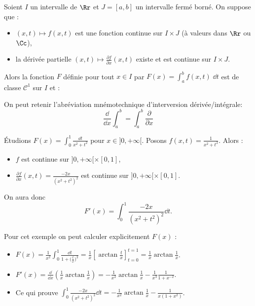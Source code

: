 \documentclass[class=report,crop=false]{standalone}
\begin{document}
\begin{theoreme}
\label{th:integralederivable}
Soient $I$ un intervalle de $\Rr$ et $J=[a,b]$ un intervalle fermé borné.
On suppose que :
\begin{itemize}
  \item $(x,t) \longmapsto f(x,t)$ est une fonction continue sur $I\times J$
  (à valeurs dans $\Rr$ ou $\Cc$),
  
  \item la dérivée partielle $(x,t) \longmapsto \frac{\partial f}{\partial x}(x,t)$
  existe et est continue sur $I\times J$.
  
\end{itemize}
Alors la fonction $F$ définie pour
tout $x\in I$ par $\displaystyle F(x) = \int_a^b f(x,t)\;\dd t$ 
est de classe $\mathcal{C}^1$ sur $I$ et :

\end{theoreme}

On peut retenir l’abréviation mnémotechnique d'interversion dérivée/intégrale: 
$$\frac{\dd}{\dd x}\int_a^b =\int_a^b \frac{\partial }{\partial x}$$



\begin{exemple}
\'Etudions $F(x)=\int_0^1 \frac{\dd t}{x^2+t^2}$ pour $x\in ]0,+\infty[$.
Posons $f(x,t)= \frac{1}{x^2+t^2}$.
Alors :
\begin{itemize}
  \item $f$ est continue sur $]0,+\infty[\times[0,1]$,
  \item $\frac{\partial f}{\partial x}(x,t)=
\frac{-2x}{(x^2+t^2)^2}$ est continue sur $]0,+\infty[\times[0,1]$.
\end{itemize}

On aura donc
$$F'(x)=\int_0^1 \frac{-2x}{(x^2+t^2)^2} \dd t.$$

Pour cet exemple on peut calculer explicitement $F(x)$ :
\begin{itemize}
  \item $\displaystyle F(x)=\frac{1}{x^2}\int_0^1 \frac{\dd t}{1+\big(\frac{t}{x}\big)^2}=
\frac{1}{x} \left[  \arctan \frac{t}{x}  \right]^{t=1}_{t=0}=
\frac{1}{x}\arctan \frac{1}{x}$.

  \item $\displaystyle F'(x)=\frac{\dd}{\dd x} \left(\frac{1}{x} \arctan \frac{1}{x}\right)= -\frac{1}{x^2}\arctan \frac{1}{x}
-\frac{1}{x^3} \frac{1}{1+x^{-2}}$.

  \item Ce qui prouve $\displaystyle \int_0^1 \frac{-2x}{(x^2+t^2)^2} \dd t= -\frac{1}{x^2}\arctan \frac{1}{x}
-\frac{1}{x(1+x^2)}$.
\end{itemize}
\end{exemple}
\end{document}
